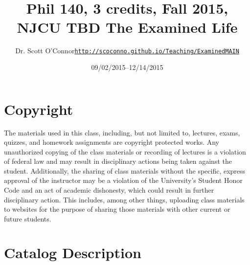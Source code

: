 \documentclass[11pt,article,oneside]{memoir}
\def\myauthor{Author}
\def\mytitle{Title}
\def\mycopyright{\myauthor}
\def\myweb{\href{http://scoconno.github.io/Teaching/ExaminedMAIN}{http://scoconno.github.io/Teaching/ExaminedMAIN}}
\def\myauthor{Dr. Scott O'Connor}
\def\mytitle{{\normalsize Phil 140, 3 credits, Fall 2015, NJCU TBD\newline} \HUGE The Examined Life}
\begin{document}
\setsansfont[Mapping=tex-text]{Georgia} 
\setmonofont[Mapping=tex-text,Scale=0.8]{Georgia} 

\def\ind{\hangindent=1 true cm\hangafter=1 \noindent}
\def\labelitemi{$\cdot$}

\pagestyle{kjh}

\title{\LARGE \mytitle}     
\author{\Large\myauthor \newline \footnotesize\texttt{\noindent\myweb}}
\date{09/02/2015--12/14/2015}

\published{\,}

\maketitle




%
%

\section{Copyright}
The materials used in this class, including, but not limited to, lectures, exams, quizzes, and homework assignments are copyright protected works.  Any unauthorized copying of the class materials or recording of lectures is a violation of federal law and may result in disciplinary actions being taken against the student.  Additionally, the sharing of class materials without the specific, express approval of the instructor may be a violation of the University's Student Honor Code and an act of academic dishonesty, which could result in further disciplinary action.  This includes, among other things, uploading class materials to websites for the purpose of sharing those materials with other current or future students. 

\section{Catalog Description}
\end{document}
